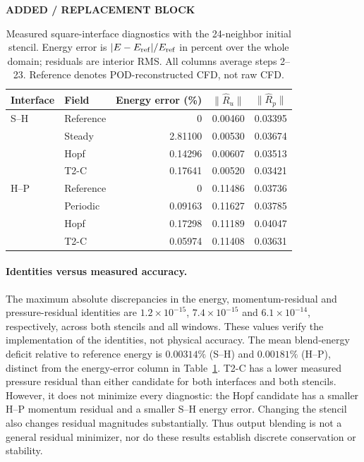 \documentclass{article}
\providecommand{\DIFaddtex}[1]{{\protect\color{blue} \sf #1}} %
\providecommand{\DIFadd}[1]{\texorpdfstring{\DIFaddtex{#1}}{#1}} %
\begin{document}
{\color{blue}
\begin{table}[H]
\color{blue}\noindent\textbf{ADDED / REPLACEMENT BLOCK}\par
\centering\small
\caption{Measured square-interface diagnostics with the 24-neighbor initial
stencil. Energy error is $|E-E_{\rm ref}|/E_{\rm ref}$ in percent over the
whole domain; residuals are interior RMS. All columns average steps 2--23.
Reference denotes POD-reconstructed CFD, not raw CFD.}
\label{tab:fusion_residual_measured}
\begin{tabular}{@{}llrrr@{}}
\toprule
Interface & Field & Energy error (\%) & $\|\widehat R_u\|$ & $\|\widehat R_p\|$\\
\midrule
S--H & Reference & 0 & 0.00460 & 0.03395\\
& Steady & 2.81100 & 0.00530 & 0.03674\\
& Hopf & 0.14296 & 0.00607 & 0.03513\\
& T2-C & 0.17641 & 0.00520 & 0.03421\\
\midrule
H--P & Reference & 0 & 0.11486 & 0.03736\\
& Periodic & 0.09163 & 0.11627 & 0.03785\\
& Hopf & 0.17298 & 0.11189 & 0.04047\\
& T2-C & 0.05974 & 0.11408 & 0.03631\\
\bottomrule
\end{tabular}
\end{table}
}




\paragraph{\DIFadd{Identities versus measured accuracy.}}
\DIFadd{The maximum absolute discrepancies in the energy, momentum-residual and
pressure-residual identities are $1.2\times10^{-15}$,
$7.4\times10^{-15}$ and $6.1\times10^{-14}$, respectively, across both
stencils and all windows. These values verify the implementation of the
identities, not physical accuracy. The mean blend-energy deficit relative
to reference energy is $0.00314\%$ (S--H) and $0.00181\%$ (H--P), distinct
from the energy-error column in Table~\ref{tab:fusion_residual_measured}.
T2-C has a lower measured pressure residual than either candidate for both
interfaces and both stencils. However, it does not minimize every diagnostic:
the Hopf candidate has a smaller H--P momentum residual and a smaller S--H
energy error. Changing the stencil also changes residual magnitudes
substantially. Thus output blending is not a general residual minimizer,
nor do these results establish discrete conservation or stability.
}
\end{document}
